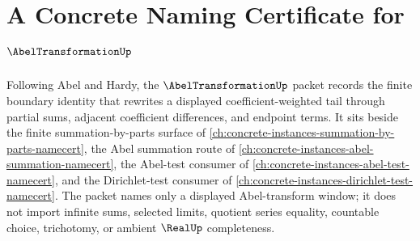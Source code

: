 \chapter{A Concrete Naming Certificate for $\AbelTransformationUp$}
\label{ch:concrete-instances-abel-transformation-namecert}

Following Abel and Hardy, the $\AbelTransformationUp$ packet records the finite boundary identity that rewrites a displayed coefficient-weighted tail through partial sums, adjacent coefficient differences, and endpoint terms. It sits beside the finite summation-by-parts surface of \autoref{ch:concrete-instances-summation-by-parts-namecert}, the Abel summation route of \autoref{ch:concrete-instances-abel-summation-namecert}, the Abel-test consumer of \autoref{ch:concrete-instances-abel-test-namecert}, and the Dirichlet-test consumer of \autoref{ch:concrete-instances-dirichlet-test-namecert}. The packet names only a displayed Abel-transform window; it does not import infinite sums, selected limits, quotient series equality, countable choice, trichotomy, or ambient $\RealUp$ completeness.

